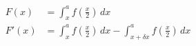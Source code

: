 \documentclass{article}
\begin{document}
  \begin{align*}
    F\left(x\right) &= \int_{x}^{a} f\left(\frac{x}{2}\right) \,dx \\
    F'\left(x\right) &= \int_{x}^{a} f\left(\frac{x}{2}\right) \,dx
                        -\int_{x + \delta{x}}^{a} f\left(\frac{x}{2}\right) \,dx
  \end{align*}
\end{document}
